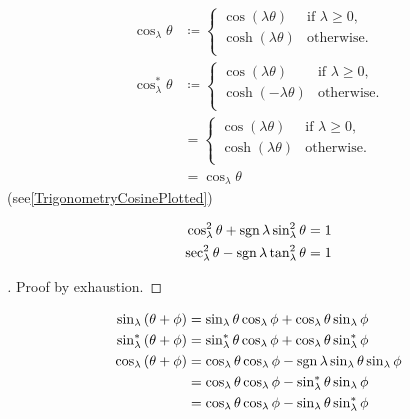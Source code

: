 \documentclass[../main.tex]{subfiles}
\begin{document}
\begin{example}\label{M:Trigonometry:Cosine}
\begin{align*}
\cos_\lambda{\theta}
&\coloneqq
\begin{cases}
\cos\left(\lambda\theta\right)&\text{if \(\lambda\geq0\),}\\
\cosh\left(\lambda\theta\right)&\text{otherwise.}\\
\end{cases}\\
\cos_\lambda^\ast{\theta}
&\coloneqq
\begin{cases}
\cos\left(\lambda\theta\right)&\text{if \(\lambda\geq0\),}\\
\cosh\left(-\lambda\theta\right)&\text{otherwise.}\\
\end{cases}\\
&=\begin{cases}
\cos\left(\lambda\theta\right)&\text{if \(\lambda\geq0\),}\\
\cosh\left(\lambda\theta\right)&\text{otherwise.}\\
\end{cases}\\
&=\cos_\lambda{\theta}
\end{align*}
(see\cref{TrigonometryCosinePlotted})
\end{example}
\begin{theorem}\label{M:Trigonometry:Pythagorean}
\begin{align*}
\cos_\lambda^2{\theta}+\operatorname{sgn}{\lambda}\sin_\lambda^2{\theta}&=1\\
\sec_\lambda^2{\theta}-\operatorname{sgn}{\lambda}\tan_\lambda^2{\theta}&=1\\
\end{align*}
\end{theorem}
\begin{proof}[]
Proof by exhaustion.
\end{proof}
\begin{proposition}\label{M:Trigonometry:Sum}
\begin{align*}
\sin_\lambda\left(\theta+\phi\right)
&=\sin_\lambda{\theta}\cos_\lambda{\phi}+\cos_\lambda{\theta}\sin_\lambda{\phi}\\
\sin_\lambda^\ast\left(\theta+\phi\right)
&=\sin_\lambda^\ast{\theta}\cos_\lambda{\phi}+\cos_\lambda{\theta}\sin_\lambda^\ast{\phi}\\
\cos_\lambda\left(\theta+\phi\right)
&=\cos_\lambda{\theta}\cos_\lambda{\phi}-\operatorname{sgn}{\lambda}\sin_\lambda{\theta}\sin_\lambda{\phi}\\
&=\cos_\lambda{\theta}\cos_\lambda{\phi}-\sin_\lambda^\ast{\theta}\sin_\lambda{\phi}\\
&=\cos_\lambda{\theta}\cos_\lambda{\phi}-\sin_\lambda{\theta}\sin_\lambda^\ast{\phi}
\end{align*}
\end{proposition}
\end{document}
